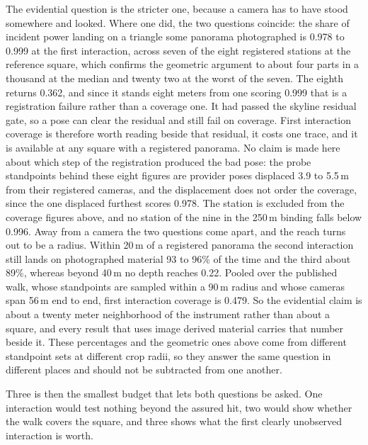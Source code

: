 The evidential question is the stricter one, because a camera has to have stood
somewhere and looked. Where one did, the two questions coincide: the share of
incident power landing on a triangle some panorama photographed is 0.978 to
0.999 at the first interaction, across seven of the eight registered stations at
the reference square, which confirms the geometric argument to about four parts
in a thousand at the median and twenty two at the worst of the seven. The eighth
returns 0.362, and since it stands eight meters from
one scoring 0.999 that is a registration failure rather than a coverage one. It
had passed the skyline residual gate, so a pose can clear the residual and still
fail on coverage. First interaction coverage is therefore worth reading beside
that residual, it costs one trace, and it is available at any square with a
registered panorama. No claim is made here about which step of the registration
produced the bad pose: the probe standpoints behind these eight figures are
provider poses displaced 3.9 to 5.5\,m from their registered cameras, and the
displacement does not order the coverage, since the one displaced furthest
scores 0.978. The station is excluded from the coverage figures above, and no
station of the nine in the 250\,m binding falls below 0.996. Away from a camera the two
questions come apart, and the reach turns out to be a radius. Within 20\,m of a
registered panorama the second interaction still lands on photographed material
93 to 96\% of the time and the third about 89\%, whereas beyond 40\,m no
depth reaches 0.22. Pooled over the published walk, whose standpoints are
sampled within a 90\,m radius and whose cameras span 56\,m end to end, first
interaction coverage is 0.479. So the evidential claim is about a twenty meter
neighborhood of the instrument rather than about a square, and every result
that uses image derived material carries that number beside it. These
percentages and the geometric ones above come from different standpoint sets at
different crop radii, so they answer the same question in different places and
should not be subtracted from one another.

Three is then the smallest budget that lets both questions be asked. One
interaction would test nothing beyond the assured hit, two would show whether
the walk covers the square, and three shows what the first clearly unobserved
interaction is worth.


